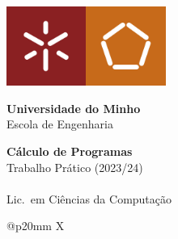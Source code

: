 \begin{titlepage}
\includegraphics[width=26mm]{cp2324t_media/UM.jpg}\includegraphics[width=26mm]{cp2324t_media/EE.jpg}

\vspace{7mm}
\leading{17pt}
{\Large
\textbf{Universidade do Minho}
\\
{\selectfont
Escola de Engenharia
}}

\vspace{50mm}
\leading{27pt}
{\huge
\textbf{Cálculo de Programas}
\\
Trabalho Prático (2023/24)}
\\
%
\\
{\LARGE
Lic.\ em Ciências da Computação
}

\vspace{50mm}
\leading{15pt}
{\Large
\begin{tabularx}{\textwidth}{@{}p{20mm} X}
     \\
     \\
    \thestudentA \\
    \thestudentB \\
    \thestudentC \\
\end{tabularx}
}

\vspace*{\fill}
{\large \myear}
\end{titlepage}
